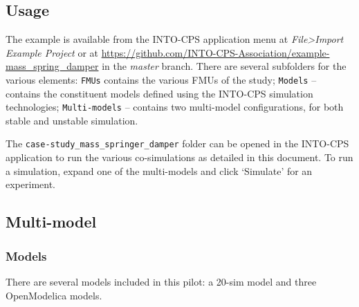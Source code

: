 \subsection{Usage}
\label{sec:masspringdamper_usage}

The example is available from the INTO-CPS application menu at \emph{File>Import Example Project} or at \url{https://github.com/INTO-CPS-Association/example-mass_spring_damper} in the \emph{master} branch. There are several subfolders for the various elements: \texttt{FMUs} contains the various FMUs of the study; \texttt{Models} -- contains the constituent models defined using the INTO-CPS simulation technologies; \texttt{Multi-models} -- contains two multi-model configurations, for both stable and unstable simulation.

The \texttt{case-study\_mass\_springer\_damper} folder can be opened in the INTO-CPS application to run the various co-simulations as detailed in this document. To run a simulation, expand one of the multi-models and click `Simulate' for an experiment. 

\subsection{Multi-model}
\label{sec:singletank_into_mm}

\subsubsection{Models}
\label{sec:singletank_into_models}

There are several models included in this pilot: a 20-sim model and three OpenModelica models.

